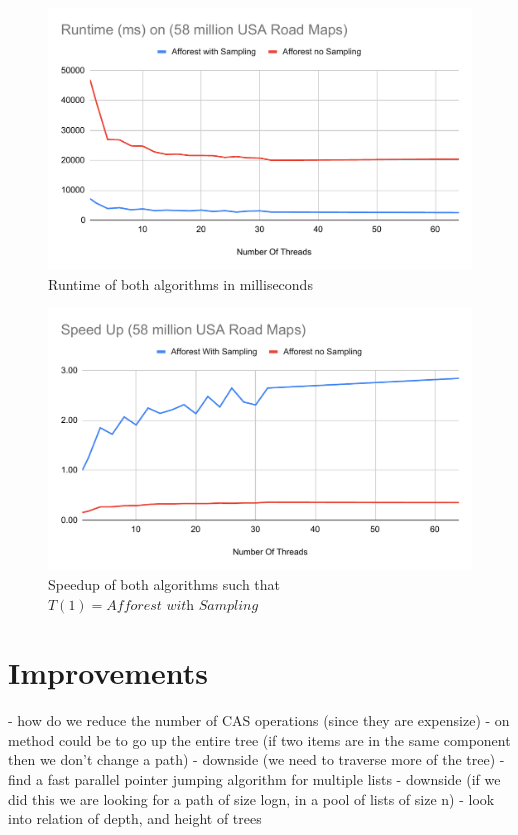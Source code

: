 \documentclass[]{article}
\begin{document}
 \begin{figure}[H]
   \includegraphics[width=\textwidth]{fig-6}
   \caption{Runtime of both algorithms in milliseconds}
   \label{fig-time}
 \end{figure}
 
 \begin{figure}[H]
   \includegraphics[width=\textwidth]{fig-7}
   \caption{Speedup of both algorithms such that $T(1) = \textit{Afforest with Sampling}$ }
   \label{fig-speed}
 \end{figure}
 \section{Improvements}
 - how do we reduce the number of CAS operations (since they are expensize)
  - on method could be to go up the entire tree (if two items are in the same component then we don't change a path)
  - downside (we need to traverse more of the tree)
  - find a fast parallel pointer jumping algorithm for multiple lists
  - downside (if we did this we are looking for a path of size logn, in a pool of lists of size n)
  - look into relation of depth, and height of trees
 
\end{document}

